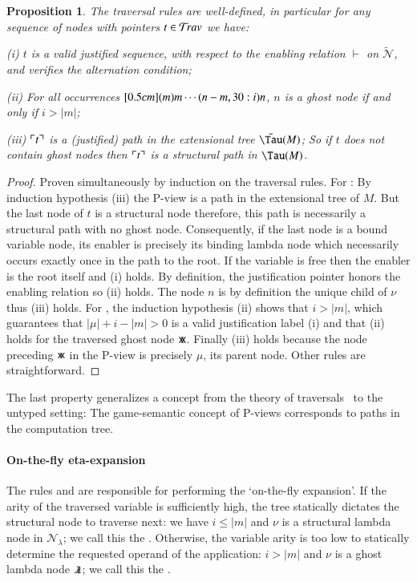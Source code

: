 \documentclass{elsarticle}
\def\shortproof{\begin{proof}}
\def\endshortproof{\end{proof}}
\theoremstyle{plain}
\newtheorem{proposition}[theorem]{Proposition}
\theoremstyle{definition}
\newcommand\Nodes{\mathcal{N}}%
\newcommand\NodesLmd{\Nodes_\lambda}%
\newcommand{\ghostlmd}{{\lambda\mkern-7mu \lambda}}
\newcommand{\ghostvar}{\mathsf{x\mkern-5mu x}}
\newcommand\ExtendedNodes{\tilde{\Nodes}}
\newcommand{\enables}{\vdash} %
\newcommand{\ctree}{\Tau} %
\newcommand{\exttree}{\tilde{\Tau}} %
\newcommand{\ExternalNodes}{\Nodes^{\sf ext}}
\begin{document}
\begin{proposition}
\label{prop:ulctrav_welldefined_pathview}
The traversal rules are well-defined, in particular for any sequence of nodes with pointers $t\in \mathcal{T}\!rav$ we have:
\begin{compactitem}
\item[(i)] $t$ is a valid justified sequence, with respect to
the enabling relation $\enables$ on $\ExtendedNodes$, and verifies the alternation condition;
\item[(ii)] For all occurrences $\Pstr[0.5cm]{(m){m} \cdots (n-m,30:i){n}}$, $n$ is a ghost node if and only if $i > |m|$;
\item[(iii)] $\ulcorner t \urcorner$ is a (justified) path in the extensional tree $\exttree(M)$;
So if $t$ does not contain ghost nodes then $\ulcorner t \urcorner$ is a structural path in $\ctree(M)$.
\end{compactitem}
\end{proposition}
\shortproof
Proven simultaneously by induction on the traversal rules.
For : By induction hypothesis (iii) the P-view is a path in the extensional tree of $M$. But the last node of $t$ is a structural node therefore, this path is necessarily a structural path with no ghost node. Consequently, if the last node is a bound variable node, its enabler is precisely its binding lambda node which necessarily occurs exactly once in the path to the root. If the variable is free then the enabler is the root itself and (i) holds. By definition, the justification pointer honors the enabling relation so (ii) holds. The node $n$ is by definition the unique child of $\nu$ thus (iii) holds.
%
For \rulenamet{Lam^\ghostvar}, the induction hypothesis (ii) shows that $i>|m|$, which guarantees that $|\mu|+i-|m|>0$ is a valid justification label (i) and that (ii) holds for the traversed ghost node $\ghostvar$.
Finally (iii) holds because the node preceding $\ghostvar$ in the P-view is precisely $\mu$, its parent node.
%
Other rules are straightforward.
\endshortproof

The last property generalizes a concept from the theory of traversals~\cite{OngLics2006,BlumPhd} to the untyped setting: The game-semantic concept of P-views corresponds to paths in the computation tree.


\paragraph{On-the-fly eta-expansion}
The rules  and  are responsible for
performing the `on-the-fly expansion'.
If the arity of the traversed variable is sufficiently high, the tree statically dictates the structural node to traverse next: we have $i \leq |m|$ and $\nu$ is a structural lambda node in $\NodesLmd$; we call this the . Otherwise, the variable arity is too low to statically determine the requested operand of the application: $i > |m|$ and $\nu$ is a ghost lambda node $\ghostlmd$; we call this the .
\end{document}
